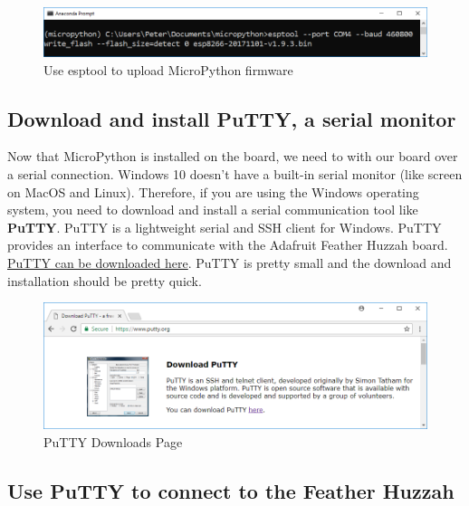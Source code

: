 \documentclass{book}
\makeatletter
\def\maxwidth{\ifdim\Gin@nat@width>\linewidth\linewidth
    \else\Gin@nat@width\fi}
\let\Oldincludegraphics\includegraphics
\renewcommand{\includegraphics}[1]{\Oldincludegraphics[width=.8\maxwidth]{#1}}
\makeatother
\begin{document}
\begin{figure}
\centering
\includegraphics{images/esptool_write_flash.PNG}
\caption{Use esptool to upload MicroPython firmware}
\end{figure}
    




    
        \subsection{Download and install PuTTY, a serial
monitor}\label{download-and-install-putty-a-serial-monitor}
    




    
        Now that MicroPython is installed on the board, we need to with our
board over a serial connection. Windows 10 doesn't have a built-in
serial monitor (like screen on MacOS and Linux). Therefore, if you are
using the Windows operating system, you need to download and install a
serial communication tool like \textbf{PuTTY}. PuTTY is a lightweight
serial and SSH client for Windows. PuTTY provides an interface to
communicate with the Adafruit Feather Huzzah board.
\href{https://www.putty.org/}{PuTTY can be downloaded here}. PuTTY is
pretty small and the download and installation should be pretty quick.

\begin{figure}
\centering
\includegraphics{images/download_putty.PNG}
\caption{PuTTY Downloads Page}
\end{figure}
    




    
        \subsection{Use PuTTY to connect to the Feather
Huzzah}\label{use-putty-to-connect-to-the-feather-huzzah}
    
\end{document}
